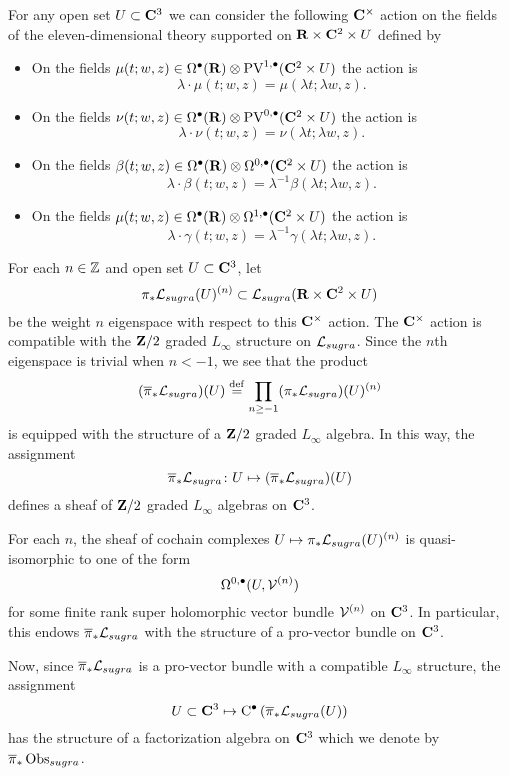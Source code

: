 \documentclass[11pt]{amsart}
\begin{document}
For any open set $U \subset \mathbf{C}^3$ we can consider the following $\mathbf{C}^\times$ action on the fields of the eleven-dimensional theory supported on $\mathbf{R} \times \mathbf{C}^2 \times U$ defined by
\begin{itemize}
\item On the fields $\mu(t;w,z) \in \Omega^\bullet(\mathbf{R}) \otimes {\rm PV}^{1,\bullet}(\mathbf{C}^2 \times U)$ the action is
\[
\lambda \cdot \mu(t;w,z) = \mu(\lambda t;\lambda w , z).
\]
\item On the fields $\nu(t;w,z) \in \Omega^\bullet(\mathbf{R}) \otimes {\rm PV}^{0,\bullet}(\mathbf{C}^2 \times U)$ the action is
\[
\lambda \cdot \nu(t;w,z) = \nu(\lambda t;\lambda w , z).
\]
\item On the fields $\beta(t;w,z) \in \Omega^\bullet(\mathbf{R}) \otimes \Omega^{0,\bullet}(\mathbf{C}^2 \times U)$ the action is
\[
\lambda \cdot \beta(t;w,z) = \lambda^{-1} \beta(\lambda t;\lambda w , z).
\]
\item On the fields $\mu(t;w,z) \in \Omega^\bullet(\mathbf{R}) \otimes \Omega^{1,\bullet}(\mathbf{C}^2 \times U)$ the action is
\[
\lambda \cdot \gamma(t;w,z) = \lambda^{-1} \gamma(\lambda t;\lambda w , z).
\]
\end{itemize}

For each $n \in \mathbb Z$ and open set $U \subset \mathbf{C}^3$, let 
\[
\pi_* \mathcal L_{sugra}(U)^{(n)} \subset \mathcal L_{sugra}(\mathbf{R} \times \mathbf{C}^2 \times U)
\]
be the weight $n$ eigenspace with respect to this $\mathbf{C}^\times$ action. 
The $\mathbf{C}^\times$ action is compatible with the $\mathbf{Z}/2$ graded $L_\infty$ structure on $\mathcal L_{sugra}$. 
Since the $n$th eigenspace is trivial when $n < -1$, we see that the product
\[
(\overline{\pi}_* \mathcal L_{sugra})(U) \overset{\rm def}{=} \prod_{n \geq -1} (\pi_*\mathcal L_{sugra})(U)^{(n)}
\]
is equipped with the structure of a $\mathbf{Z}/2$ graded $L_\infty$ algebra.
In this way, the assignment 
\[
\overline{\pi}_* \mathcal L_{sugra} \colon U \mapsto (\overline{\pi}_* \mathcal L_{sugra})(U) 
\]
defines a sheaf of $\mathbf{Z}/2$ graded $L_\infty$ algebras on $\mathbf{C}^3$. 

\begin{prop}
For each $n$, the sheaf of cochain complexes $U \mapsto \pi_* \mathcal L_{sugra}(U)^{(n)}$ is quasi-isomorphic to one of the form
\[
\Omega^{0,\bullet}(U, \mathcal V^{(n)})
\]
for some finite rank super holomorphic vector bundle $\mathcal V^{(n)}$ on $\mathbf{C}^3$. 
In particular, this endows $\overline{\pi}_* \mathcal L_{sugra}$ with the structure of a pro-vector bundle on $\mathbf{C}^3$. 
\end{prop}

Now, since $\overline{\pi}_* \mathcal L_{sugra}$ is a pro-vector bundle with a compatible $L_\infty$ structure, the assignment 
\[
U\subset \mathbf{C}^3 \mapsto {\rm C}^\bullet\left(\overline{\pi}_* \mathcal L_{sugra}(U)\right) 
\]
has the structure of a factorization algebra on $\mathbf{C}^3$ which we denote by $\overline{\pi}_* \operatorname{Obs}_{sugra}$. 
\end{document}
